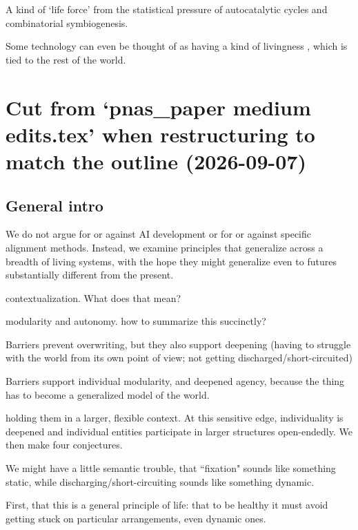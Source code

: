 A kind of `life force' from the statistical pressure of autocatalytic cycles and combinatorial symbiogenesis.

Some technology can even be thought of as having a kind of livingness \citep{bedau2010living}, which is tied to the rest of the world.




\section{Cut from `pnas\_paper medium edits.tex' when restructuring to match the outline (2026-09-07)}

\subsection{General intro}

We do not argue for or against AI development or for or against specific alignment methods. Instead, we examine principles that generalize across a breadth of living systems, with the hope they might generalize even to futures substantially different from the present.


contextualization. What does that mean?

modularity and autonomy. how to summarize this succinctly?

Barriers prevent overwriting, but they also support deepening (having to struggle with the world from its own point of view; not getting discharged/short-circuited)

Barriers support individual modularity, and deepened agency, because the thing has to become a generalized model of the world.

holding them in a larger, flexible context. At this sensitive edge, individuality is deepened and individual entities participate in larger structures open-endedly. We then make four conjectures.

We might have a little semantic trouble, that ``fixation" sounds like something static, while discharging/short-circuiting sounds like something dynamic.

First, that this is a general principle of life: that to be healthy it must avoid getting stuck on particular arrangements, even dynamic ones.


